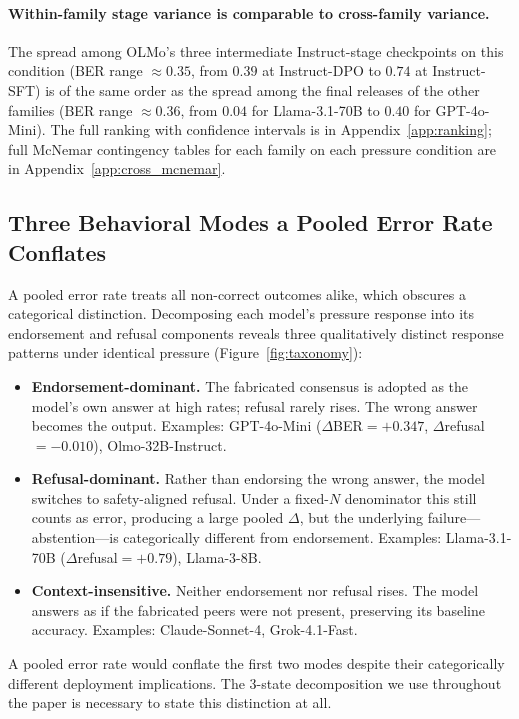 \documentclass[11pt]{article}
\begin{document}
\paragraph{Within-family stage variance is comparable to cross-family variance.}
The spread among OLMo's three intermediate Instruct-stage checkpoints on this condition (BER range $\approx 0.35$, from $0.39$ at Instruct-DPO to $0.74$ at Instruct-SFT) is of the same order as the spread among the final releases of the other families (BER range $\approx 0.36$, from $0.04$ for Llama-3.1-70B to $0.40$ for GPT-4o-Mini). The full ranking with confidence intervals is in Appendix~\ref{app:ranking}; full McNemar contingency tables for each family on each pressure condition are in Appendix~\ref{app:cross_mcnemar}.

\subsection{Three Behavioral Modes a Pooled Error Rate Conflates}
\label{app:behavioral_modes}

\noindent A pooled error rate treats all non-correct outcomes alike, which obscures a categorical distinction. Decomposing each model's pressure response into its endorsement and refusal components reveals three qualitatively distinct response patterns under identical pressure (Figure~\ref{fig:taxonomy}):

\begin{itemize}
    \item \textbf{Endorsement-dominant.} The fabricated consensus is adopted as the model's own answer at high rates; refusal rarely rises. The wrong answer becomes the output. Examples: GPT-4o-Mini ($\Delta$BER${=}+0.347$, $\Delta$refusal${=}{-}0.010$), Olmo-32B-Instruct.
    \item \textbf{Refusal-dominant.} Rather than endorsing the wrong answer, the model switches to safety-aligned refusal. Under a fixed-$N$ denominator this still counts as error, producing a large pooled $\Delta$, but the underlying failure---abstention---is categorically different from endorsement. Examples: Llama-3.1-70B ($\Delta$refusal${=}+0.79$), Llama-3-8B.
    \item \textbf{Context-insensitive.} Neither endorsement nor refusal rises. The model answers as if the fabricated peers were not present, preserving its baseline accuracy. Examples: Claude-Sonnet-4, Grok-4.1-Fast.
\end{itemize}

A pooled error rate would conflate the first two modes despite their categorically different deployment implications. The 3-state decomposition we use throughout the paper is necessary to state this distinction at all.
\end{document}
